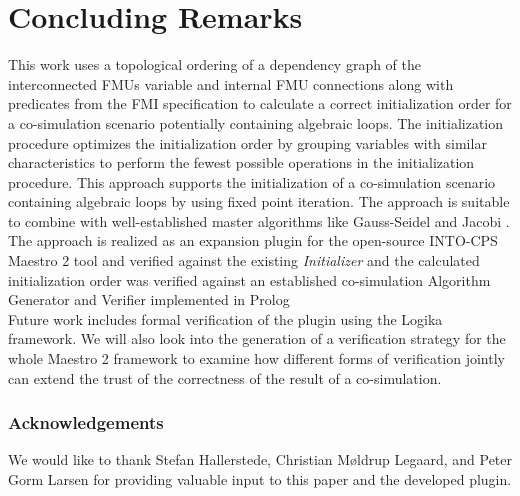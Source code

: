 \section{Concluding Remarks}\label{sc:summary}
This work uses a topological ordering of a dependency graph of the interconnected FMUs variable and internal FMU connections along with predicates from the FMI specification to calculate a correct initialization order for a co-simulation scenario potentially containing algebraic loops.
The initialization procedure optimizes the initialization order by grouping variables with similar characteristics to perform the fewest possible operations in the initialization procedure.
This approach supports the initialization of a co-simulation scenario containing algebraic loops by using fixed point iteration. 
The approach is suitable to combine with well-established master algorithms like Gauss-Seidel and Jacobi \cite{Palensky2017}. 
The approach is realized as an expansion plugin for the open-source INTO-CPS Maestro 2 tool and verified against the existing \textit{Initializer} and the calculated initialization order was verified against an established co-simulation Algorithm Generator and Verifier implemented in Prolog\cite{gomes_lucio_vangheluwe_2019}\\
Future work includes formal verification of the plugin using the Logika framework\cite{Robby2018}.
We will also look into the generation of a verification strategy for the whole Maestro 2 framework to examine how different forms of verification jointly can extend the trust of the correctness of the result of a co-simulation. 

\subsubsection*{Acknowledgements} We would like to thank Stefan Hallerstede, Christian Møldrup Legaard, and Peter Gorm Larsen for providing valuable input to this paper and the developed plugin.